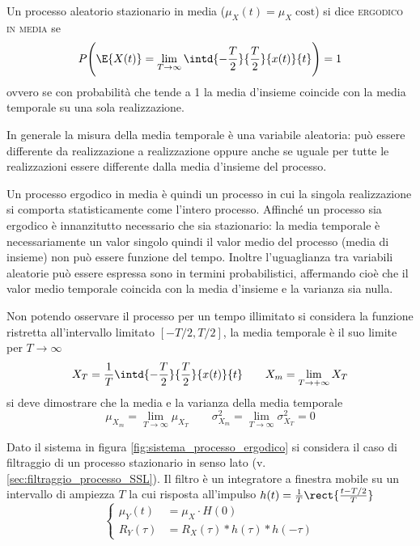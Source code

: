 \begin{definizione}
Un processo aleatorio stazionario in media ($\mu_X(t)=\mu_X \;\text{cost}$) si dice \textsc{ergodico in media} se
\begin{equation}
	P\Bigg( \E{X(t)}=\lim\limits_{T\to\infty}\intd{-\frac{T}{2}}{\frac{T}{2}}{x(t)}{t}\Bigg)=1
\end{equation}
ovvero se con probabilità che tende a 1 la media d'insieme coincide con la media temporale su una sola realizzazione.
\end{definizione}

In generale la misura della media temporale è una variabile aleatoria: può essere differente da realizzazione a realizzazione oppure anche se uguale per tutte le realizzazioni essere differente dalla media d'insieme del processo.

Un processo ergodico in media è quindi un processo in cui la singola realizzazione si comporta statisticamente come l'intero processo.
Affinché un processo sia ergodico è innanzitutto necessario che sia stazionario: la media temporale è necessariamente un valor singolo quindi il valor medio del processo (media di insieme) non può essere funzione del tempo.
Inoltre l'uguaglianza tra variabili aleatorie può essere espressa sono in termini probabilistici, affermando cioè che il valor medio temporale coincida con la media d'insieme e la varianza sia nulla.

Non potendo osservare il processo per un tempo illimitato si considera la funzione ristretta all'intervallo limitato $[-T/2,T/2]$, la media temporale è il suo limite per $T\to\infty$
\[
	X_T=\frac{1}{T}\intd{-\frac{T}{2}}{\frac{T}{2}}{x(t)}{t}\qquad X_m=\lim\limits_{T\to +\infty}X_T
\]
si deve dimostrare che la media e la varianza della media temporale
\[
	\mu_{X_m}=\lim\limits_{T\to\infty}\mu_{X_T}\qquad\sigma^2_{X_m}=\lim\limits_{T\to\infty}\sigma^2_{X_T}=0
\]

Dato il sistema in figura \ref{fig:sistema_processo_ergodico} si considera il caso di filtraggio di un processo stazionario in senso lato (v.\ref{sec:filtraggio_processo_SSL}). Il filtro è un integratore a finestra mobile su un intervallo di ampiezza $T$ la cui risposta all'impulso $h(t)=\frac{1}{T}\rect{\frac{t-T/2}{T}}$
\[
	\begin{cases}
		\mu_Y(t)&=\mu_X\cdot H(0)\\
		R_Y(\tau)&=R_X(\tau)\ast h(\tau)\ast h(-\tau)
	\end{cases}
\]

